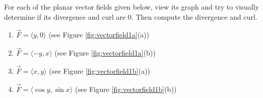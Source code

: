 {For each of the planar vector fields given below, view its graph and try to visually determine if its divergence and curl are 0. Then compute the divergence and curl.

\begin{enumerate}
	\item $\vec F = \langle y,0\rangle$ (see Figure \ref{fig:vectorfield1a}(a))
	\item $\vec F = \langle -y,x\rangle$ (see Figure \ref{fig:vectorfield1a}(b))
	\item $\vec F = \langle x,y\rangle$ (see Figure \ref{fig:vectorfield1b}(a))
	\item $\vec F = \langle \cos y, \sin x\rangle$ (see Figure \ref{fig:vectorfield1b}(b))
\end{enumerate}
}
